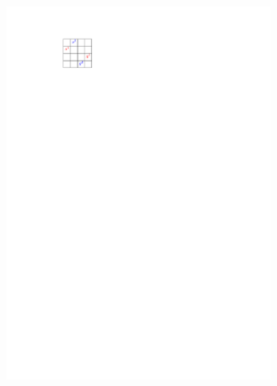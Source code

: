 \documentclass[letterpaper]{article}
\theoremstyle{definition}
\begin{document}
\begin{figure}[t]
  \begin{subfigure}[b]{0.12\textwidth}
    \centering
	\includegraphics[width=0.95\textwidth]{Figs/example1_map.pdf}
    \caption{}
  \end{subfigure}
  \begin{subfigure}[b]{0.12\textwidth}

\end{subfigure}
\end{figure}
\end{document}

